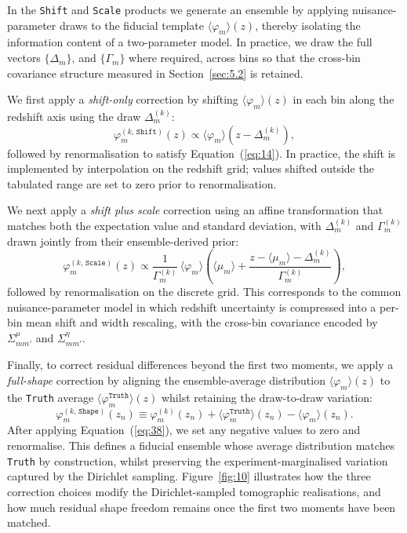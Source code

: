 In the \texttt{Shift} and \texttt{Scale} products we generate an ensemble by applying nuisance-parameter draws to the fiducial template \(\langle \varphi_m \rangle(z)\), thereby isolating the information content of a two-parameter model. In practice, we draw the full vectors \(\{\Delta_m\}\), and \(\{\Gamma_m\}\) where required, across bins so that the cross-bin covariance structure measured in Section~\ref{sec:5.2} is retained.

We first apply a \textit{shift-only} correction by shifting \(\langle \varphi_m \rangle(z)\) in each bin along the redshift axis using the draw \(\Delta_m^{(k)}\):
\begin{equation} \label{eq:36}
    \varphi^{(k,\,\texttt{Shift})}_m(z) \propto \langle \varphi_m \rangle (z - \Delta_m^{(k)}),
\end{equation}
followed by renormalisation to satisfy Equation~(\ref{eq:14}). In practice, the shift is implemented by interpolation on the redshift grid; values shifted outside the tabulated range are set to zero prior to renormalisation.

We next apply a \textit{shift plus scale} correction using an affine transformation that matches both the expectation value and standard deviation, with \(\Delta_m^{(k)}\) and \(\Gamma_m^{(k)}\) drawn jointly from their ensemble-derived prior:
\begin{equation} \label{eq:37}
    \varphi^{(k,\,\texttt{Scale})}_m(z) \propto \frac{1}{\Gamma_m^{(k)}}\,
    \langle \varphi_m \rangle \! \left(\langle \mu_m \rangle + \frac{z - \langle \mu_m \rangle - \Delta_m^{(k)}}{\Gamma_m^{(k)}}\right),
\end{equation}
followed by renormalisation on the discrete grid. This corresponds to the common nuisance-parameter model in which redshift uncertainty is compressed into a per-bin mean shift and width rescaling, with the cross-bin covariance encoded by \(\Sigma^\mu_{m m'}\) and \(\Sigma^\eta_{m m'}\).

Finally, to correct residual differences beyond the first two moments, we apply a \textit{full-shape} correction by aligning the ensemble-average distribution \(\langle \varphi_m \rangle(z)\) to the \texttt{Truth} average \(\langle \varphi^{\texttt{Truth}}_m \rangle(z)\) whilst retaining the draw-to-draw variation:
\begin{equation} \label{eq:38}
    \varphi^{(k,\,\texttt{Shape})}_m(z_n) \equiv \varphi^{(k)}_m(z_n)
    + \langle \varphi^{\texttt{Truth}}_m \rangle(z_n) - \langle \varphi_m \rangle(z_n).
\end{equation}
After applying Equation~(\ref{eq:38}), we set any negative values to zero and renormalise. This defines a fiducial ensemble whose average distribution matches \texttt{Truth} by construction, whilst preserving the experiment-marginalised variation captured by the Dirichlet sampling. Figure~\ref{fig:10} illustrates how the three correction choices modify the Dirichlet-sampled tomographic realisations, and how much residual shape freedom remains once the first two moments have been matched.

